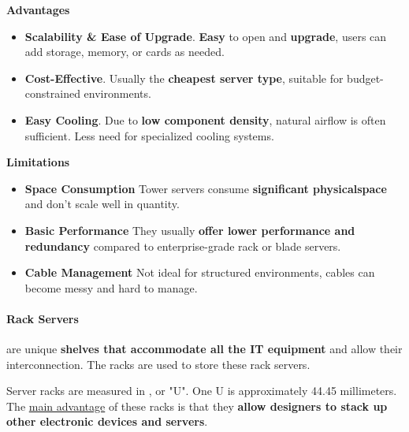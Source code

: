 \highspace
\begin{flushleft}
    \textcolor{Green3}{ \textbf{Advantages}}
\end{flushleft}
\begin{itemize}[label=\textcolor{Green3}{}]
    \item \textcolor{Green3}{\textbf{Scalability \& Ease of Upgrade}}. \textbf{Easy} to open and \textbf{upgrade}, users can add storage, memory, or cards as needed.
    \item \textcolor{Green3}{\textbf{Cost-Effective}}. Usually the \textbf{cheapest server type}, suitable for budget-constrained environments.
    \item \textcolor{Green3}{\textbf{Easy Cooling}}. Due to \textbf{low component density}, natural airflow is often sufficient. Less need for specialized cooling systems.
\end{itemize}

\highspace
\begin{flushleft}
    \textcolor{Red2}{ \textbf{Limitations}}
\end{flushleft}
\begin{itemize}[label=\textcolor{Red2}{}]
    \item \textcolor{Red2}{\textbf{Space Consumption}} Tower servers consume \textbf{significant physical\break space} and don't scale well in quantity.
    \item \textcolor{Red2}{\textbf{Basic Performance}} They usually \textbf{offer lower performance and redundancy} compared to enterprise-grade rack or blade servers.
    \item \textcolor{Red2}{\textbf{Cable Management}} Not ideal for structured environments, cables can become messy and hard to manage.
\end{itemize}

\newpage

\paragraph{Rack Servers}\label{paragraph: Rack Servers}

 are unique \textbf{shelves that accommodate all the IT equipment} and allow their interconnection. The racks are used to store these rack servers.

\highspace
Server racks are measured in , or "U". One U is approximately 44.45 millimeters. The \underline{main advantage} of these racks is that they \textbf{allow designers to stack up other electronic devices and servers}.

